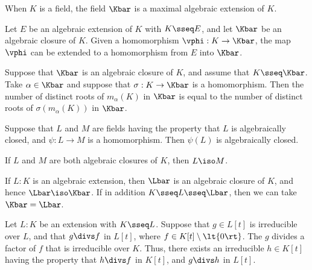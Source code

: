 \documentclass{article}
\begin{document}
  \begin{corollary}
    When $ K $ is a field, the field $ \Kbar $ is a maximal algebraic extension of $ K $.
  \end{corollary}

  \begin{theorem}
    Let $ E $ be an algebraic extension of $ K $ with $ K\sseq E $, and let $ \Kbar $ be an algebraic closure of $ K $.
    Given a homomorphism $ \vphi:K\to \Kbar $, the map $ \vphi $ can be extended to a homomorphism from $ E $ into $ \Kbar $.
  \end{theorem}

  \begin{corollary}
    Suppose that $ \Kbar $ is an algebraic closure of $ K $, and assume that $ K\sseq \Kbar $.
    Take $ \alpha\in \Kbar $ and suppose that $ \sigma:K\to \Kbar $ is a homomorphism.
    Then the number of distinct roots of $ m_\alpha(K) $ in $ \Kbar $ is equal to the number of distinct roots of $ \sigma(m_\alpha(K)) $ in $ \Kbar $.
  \end{corollary}

  \begin{proposition}
    Suppose that $L$ and $M$ are fields having the property that $L$ is algebraically closed, and $\psi : L \to M $ is a homomorphism.
    Then $\psi(L)$ is algebraically closed.
  \end{proposition}

  \begin{proposition}
    If $L$ and $M$ are both algebraic closures of $K$, then $L \iso M$.
  \end{proposition}

  \begin{proposition}
    If $ L:K $ is an algebraic extension, then $ \Lbar $ is an algebraic closure of $ K $, and hence $ \Lbar\iso\Kbar $.
    If in addition $ K\sseq L\sseq \Lbar $, then we can take $ \Kbar = \Lbar $.
  \end{proposition}

  \begin{proposition}
    Let $ L:K $ be an extension with $ K\sseq L $.
    Suppose that $ g\in L[t] $ is irreducible over $ L $, and that $ g\divs f $ in $ L[t] $, where $ f\in K[t]\setminus \lt\{ 0 \rt\} $.
    The $ g $ divides a factor of $ f $ that is irreducible over $ K $.
    Thus, there exists an irreducible $ h\in K[t] $ having the property that $ h\divs f $ in $ K[t] $, and $ g\divs h $ in $ L[t] $.
  \end{proposition}
\end{document}
